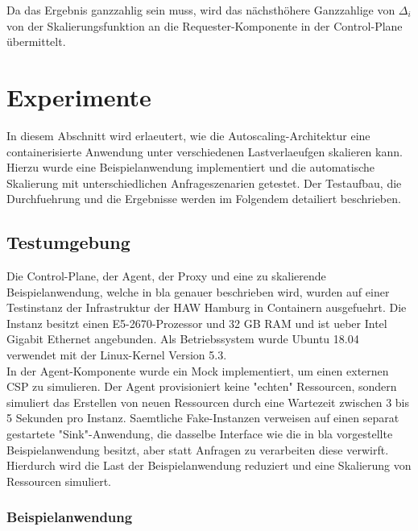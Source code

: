 \documentclass[runningheads]{llncs}
\begin{document}
Da das Ergebnis ganzzahlig sein muss, wird das nächsthöhere Ganzzahlige von $\Delta_{i}$ von der Skalierungsfunktion an die Requester-Komponente in der Control-Plane übermittelt.


\section{Experimente}

In diesem Abschnitt wird erlaeutert, wie die Autoscaling-Architektur eine containerisierte Anwendung unter verschiedenen Lastverlaeufgen skalieren kann. Hierzu wurde eine Beispielanwendung implementiert und die automatische Skalierung mit unterschiedlichen Anfrageszenarien getestet. Der Testaufbau, die Durchfuehrung und die Ergebnisse werden im Folgendem detailiert beschrieben.

\subsection{Testumgebung}

Die Control-Plane, der Agent, der Proxy und eine zu skalierende Beispielanwendung, welche in bla genauer beschrieben wird, wurden auf einer Testinstanz der Infrastruktur der HAW Hamburg in Containern ausgefuehrt. Die Instanz besitzt einen E5-2670-Prozessor und 32 GB RAM und ist ueber Intel Gigabit Ethernet angebunden. Als Betriebssystem wurde Ubuntu 18.04 verwendet mit der Linux-Kernel Version 5.3. \\

In der Agent-Komponente wurde ein Mock implementiert, um einen externen CSP zu simulieren. Der Agent provisioniert keine "echten" Ressourcen, sondern simuliert das Erstellen von neuen Ressourcen durch eine Wartezeit zwischen 3 bis 5 Sekunden pro Instanz. Saemtliche Fake-Instanzen verweisen auf einen separat gestartete "Sink"-Anwendung, die dasselbe Interface wie die in bla vorgestellte Beispielanwendung besitzt, aber statt Anfragen zu verarbeiten diese verwirft. Hierdurch wird die Last der Beispielanwendung reduziert und eine Skalierung von Ressourcen simuliert.

\subsubsection{Beispielanwendung} \hfill\\
\end{document}
